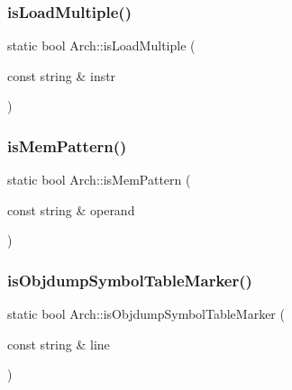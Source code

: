 \subsubsection{\texorpdfstring{is\+Load\+Multiple()}{isLoadMultiple()}}
{\footnotesize\ttfamily static bool Arch\+::is\+Load\+Multiple (\begin{DoxyParamCaption}\item[{const string \&}]{instr }\end{DoxyParamCaption})\hspace{0.3cm}{\ttfamily [static]}}

\mbox{\label{classArch_ad5c5d6cd8d1a555d0949baadfb83f59a}} 
\subsubsection{\texorpdfstring{is\+Mem\+Pattern()}{isMemPattern()}}
{\footnotesize\ttfamily static bool Arch\+::is\+Mem\+Pattern (\begin{DoxyParamCaption}\item[{const string \&}]{operand }\end{DoxyParamCaption})\hspace{0.3cm}{\ttfamily [static]}}

\mbox{\label{classArch_a0c35ca4d2805a080172f6c172762abe6}} 
\subsubsection{\texorpdfstring{is\+Objdump\+Symbol\+Table\+Marker()}{isObjdumpSymbolTableMarker()}}
{\footnotesize\ttfamily static bool Arch\+::is\+Objdump\+Symbol\+Table\+Marker (\begin{DoxyParamCaption}\item[{const string \&}]{line }\end{DoxyParamCaption})\hspace{0.3cm}{\ttfamily [static]}}

\mbox{\label{classArch_a1812a3a694bb2ee08f2d20a68e0796aa}} 

